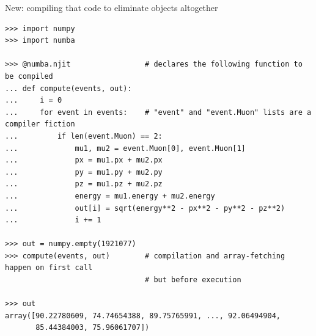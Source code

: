 \documentclass[aspectratio=169]{beamer}
\begin{document}
\begin{frame}[fragile]{New: compiling that code to eliminate objects altogether}
\vspace{0.15 cm}
\scriptsize
\begin{verbatim}
>>> import numpy
>>> import numba

>>> @numba.njit                 # declares the following function to be compiled
... def compute(events, out):
...     i = 0
...     for event in events:    # "event" and "event.Muon" lists are a compiler fiction
...         if len(event.Muon) == 2:
...             mu1, mu2 = event.Muon[0], event.Muon[1]
...             px = mu1.px + mu2.px
...             py = mu1.py + mu2.py
...             pz = mu1.pz + mu2.pz
...             energy = mu1.energy + mu2.energy
...             out[i] = sqrt(energy**2 - px**2 - py**2 - pz**2)
...             i += 1

>>> out = numpy.empty(1921077)
>>> compute(events, out)        # compilation and array-fetching happen on first call
                                # but before execution

>>> out
array([90.22780609, 74.74654388, 89.75765991, ..., 92.06494904,
       85.44384003, 75.96061707])
\end{verbatim}
\end{frame}
\end{document}

